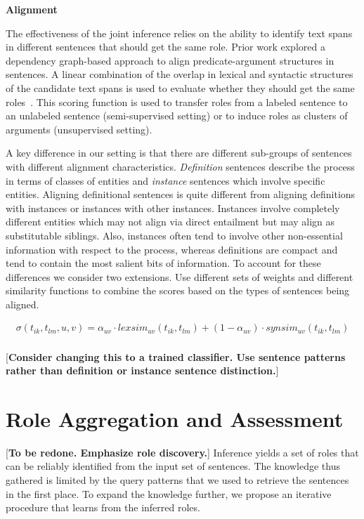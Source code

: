 {\bf Alignment}

The effectiveness of the joint inference relies on the ability to identify text spans in different sentences that should get the same role. 
Prior work explored a dependency graph-based approach to align predicate-argument structures in sentences. A linear combination of the overlap in lexical and syntactic structures of the candidate text spans is used to evaluate whether they should get the same roles~\cite{furstenau-emnlp2009,furstenau2012semi,lang-naacl2010}.
This scoring function is used to transfer roles from a labeled sentence to an unlabeled sentence (semi-supervised setting) or to induce roles as clusters of arguments (unsupervised setting). 

A key difference in our setting is that there are different sub-groups of sentences with different alignment characteristics. 
{\em Definition} sentences describe the process in terms of classes of entities and {\em instance} sentences which involve specific entities.
Aligning definitional sentences is quite different from aligning definitions with instances or instances with other instances. 
Instances involve completely different entities which may not align via direct entailment but may align as substitutable siblings.
Also, instances often tend to involve other non-essential information with respect to the process, 
whereas definitions are compact and tend to contain the most salient bits of information. 
To account for these differences we consider two extensions. Use different sets of weights and different similarity functions to combine the scores based on the types of sentences being aligned.

\begin{align*}
\sigma(t_{ik}, t_{lm}, u, v)	= \alpha_{uv} \cdot lexsim_{uv}(t_{ik}, t_{lm}) + (1 - \alpha_{uv}) \cdot synsim_{uv}(t_{ik}, t_{lm})\\
\end{align*}

[{\bf Consider changing this to a trained classifier. Use sentence patterns rather than definition or instance sentence distinction.}]

\section{Role Aggregation and Assessment}
[{\bf To be redone. Emphasize role discovery.}]
Inference yields a set of roles that can be reliably identified from the input set of sentences. 
The knowledge thus gathered is limited by the query patterns that we used to retrieve the sentences in the first place. To expand the knowledge further, we propose an iterative procedure that learns from the inferred roles. 

